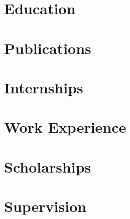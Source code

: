 \documentclass{prometheus_cv}
\begin{document}
\thispagestyle{empty}					%
\pagestyle{fancy}			 		%

\vspace*{-1cm}
\centering


\vspace*{0.15cm}
\section{Education}


\section{Publications}


\section{Internships}


\section{Work Experience}


\section{Scholarships}



\section{Supervision}

\end{document}

